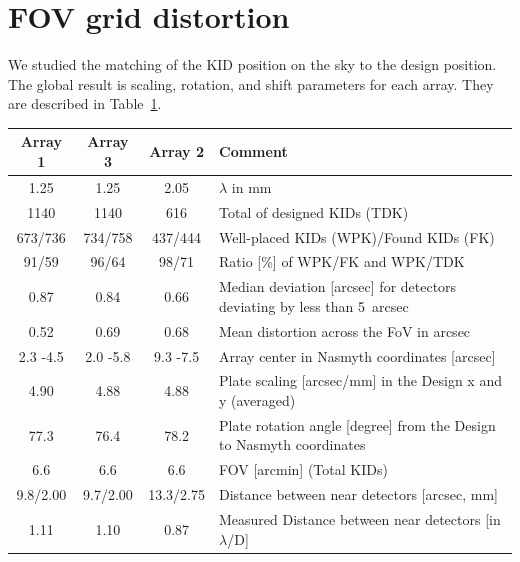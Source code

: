 \section{FOV grid distortion}%
\label{se:grid_distortion}

We studied the matching of the KID position on the sky to the
design position. The global result is scaling, rotation, and shift parameters for each
array. They are described in Table~\ref{ta:gridmatch}.

\begin{table}[ht]
\label{ta:gridmatch}
\begin{center}
\begin{tabular}{|c|c|c|l|}
\hline
Array 1  &	Array 3   &	Array 2   &	Comment \\
\hline
1.25     &      1.25      &     2.05     &     \small{$\lambda$ in mm} \\
1140 	 &      1140 	   &        616  &     \small{Total of designed KIDs (TDK)} \\
673/736  &	734/758  &	437/444  &     \small{Well-placed KIDs (WPK)/Found KIDs (FK)} \\
91/59 	 &    96/64 	 &      98/71 	 & \small{Ratio [\%] of WPK/FK and WPK/TDK} \\
0.87 	 &     0.84 	  & 0.66     &	\small{Median deviation [arcsec] for detectors deviating by less than 5~arcsec} \\
0.52 	 &     0.69 	 &        0.68 	 & \small{Mean distortion across the FoV in arcsec} \\
2.3 -4.5  &	2.0 -5.8  &	9.3 -7.5  &	\small{Array center in Nasmyth coordinates [arcsec]} \\
4.90  &	4.88  &	4.88  &	\small{Plate scaling [arcsec/mm] in the Design x and y (averaged)} \\
77.3  &	76.4  &	78.2  &	\small{Plate rotation angle [degree] from the Design to Nasmyth coordinates} \\
6.6  &	6.6  &	6.6  &	\small{FOV [arcmin] (Total KIDs)} \\
9.8/2.00  &	9.7/2.00  &	13.3/2.75  &	\small{Distance between near detectors [arcsec, mm]} \\
1.11  &	1.10  &	0.87  &	\small{Measured Distance between near
  detectors [in $\lambda$/D] } \\

\end{tabular}
\end{center}
\end{table}
